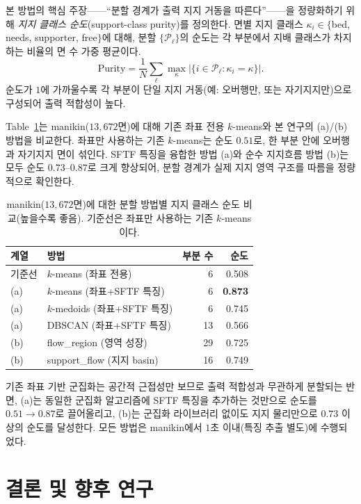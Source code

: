 \documentclass[11pt,a4paper]{article}
\begin{document}
본 방법의 핵심 주장——``분할 경계가 출력 지지 거동을 따른다''——을 정량화하기 위해
\emph{지지 클래스 순도}(support-class purity)를 정의한다.
면별 지지 클래스 $\kappa_i\in\{$bed, needs, supporter, free$\}$에 대해,
분할 $\{\mathcal{P}_\ell\}$의 순도는 각 부분에서 지배 클래스가 차지하는 비율의
면 수 가중 평균이다.
\begin{equation}
\mathrm{Purity}
= \frac{1}{N}\sum_\ell \max_{\kappa}
\big|\{i\in\mathcal{P}_\ell : \kappa_i=\kappa\}\big|.
\end{equation}
순도가 $1$에 가까울수록 각 부분이 단일 지지 거동(예: 오버행만, 또는 자기지지만)으로
구성되어 출력 적합성이 높다.

Table~\ref{tab:purity}는 manikin($13{,}672$면)에 대해
기존 좌표 전용 $k$-means와 본 연구의 (a)/(b) 방법을 비교한다.
좌표만 사용하는 기존 $k$-means는 순도 $0.51$로,
한 부분 안에 오버행과 자기지지 면이 섞인다.
SFTF 특징을 융합한 방법 (a)와 순수 지지흐름 방법 (b)는 모두 순도 $0.73$--$0.87$로
크게 향상되어, 분할 경계가 실제 지지 영역 구조를 따름을 정량적으로 확인한다.

\begin{table}[H]
\centering
\caption{manikin($13{,}672$면)에 대한 분할 방법별 지지 클래스 순도 비교(높을수록 좋음).
기준선은 좌표만 사용하는 기존 $k$-means이다.}
\label{tab:purity}
\begin{tabular}{llrr}
\toprule
계열 & 방법 & 부분 수 & 순도\\
\midrule
기준선 & $k$-means (좌표 전용)          & 6  & 0.508\\
\midrule
(a)   & $k$-means (좌표+SFTF 특징)     & 6  & \textbf{0.873}\\
(a)   & $k$-medoids (좌표+SFTF 특징)   & 6  & 0.745\\
(a)   & DBSCAN (좌표+SFTF 특징)        & 13 & 0.566\\
\midrule
(b)   & flow\_region (영역 성장)       & 29 & 0.725\\
(b)   & support\_flow (지지 basin)     & 16 & 0.749\\
\bottomrule
\end{tabular}
\end{table}

기존 좌표 기반 군집화는 공간적 근접성만 보므로 출력 적합성과 무관하게 분할되는 반면,
(a)는 동일한 군집화 알고리즘에 SFTF 특징을 추가하는 것만으로 순도를 $0.51\to0.87$로 끌어올리고,
(b)는 군집화 라이브러리 없이도 지지 물리만으로 $0.73$ 이상의 순도를 달성한다.
모든 방법은 manikin에서 $1$초 이내(특징 추출 별도)에 수행되었다.

\section{결론 및 향후 연구}
\end{document}
